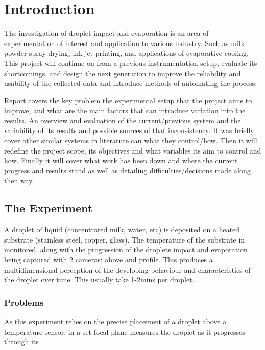\chapter{Introduction}\label{C:intro}
The investigation of droplet impact and evaporation is an area of experimentation of interest and application to various industry. Such as milk powder spray drying, ink jet printing, and applications of evaporative cooling. This project will continue on from a previous instrumentation setup, evaluate its shortcomings, and design the next generation to improve the reliability and usability of the collected data and introduce methods of automating the process. 

Report covers the key problem the experimental setup that the project aims to improve, and what are the main factors that can introduce variation into the results. An overview and evaluation of the current/previous system and the variability of its results and possible sources of that inconsistency. It was briefly cover other similar systems in literature can what they control/how. Then it will redefine the project scope, its objectives and what variables its aim to control and how. Finally it will cover what work has been down and where the current progress and results stand as well as detailing difficulties/decisions made along then way.  

\section*{The Experiment}

A droplet of liquid (concentrated milk, water, etc) is deposited on a heated substrate (stainless steel, copper, glass). The temperature of the substrate in monitored, along with the progression of the droplets impact and evaporation being captured with 2 cameras; above and profile. This produces a multidimensional perception of the developing behaviour and characteristics of the droplet over time. This usually take 1-2mins per droplet.

\subsection*{Problems}

As this experiment relies on the precise placement of a droplet above a temperature sensor, in a set focal plane measures the droplet as it progresses through its